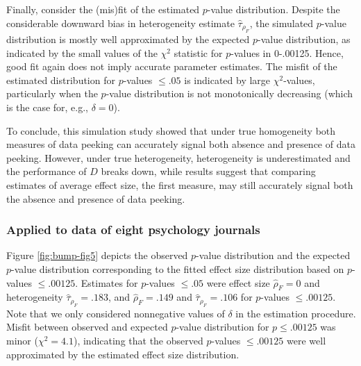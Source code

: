 \documentclass[a5paper]{book}
\begin{document}
Finally, consider the (mis)fit of the estimated \(p\)-value
distribution. Despite the considerable downward bias in heterogeneity
estimate \(\hat{\tau}_{\rho_F}\), the simulated \(p\)-value distribution
is mostly well approximated by the expected \(p\)-value distribution, as
indicated by the small values of the \(\chi^2\) statistic for
\(p\)-values in 0-.00125. Hence, good fit again does not imply accurate
parameter estimates. The misfit of the estimated distribution for
\(p\)-values \(\leq.05\) is indicated by large \(\chi^2\)-values,
particularly when the \(p\)-value distribution is not monotonically
decreasing (which is the case for, e.g., \(\delta=0\)).

To conclude, this simulation study showed that under true homogeneity
both measures of data peeking can accurately signal both absence and
presence of data peeking. However, under true heterogeneity,
heterogeneity is underestimated and the performance of \(D\) breaks
down, while results suggest that comparing estimates of average effect
size, the first measure, may still accurately signal both the absence
and presence of data peeking.

\subsubsection{Applied to data of eight psychology
journals}\label{applied-to-data-of-eight-psychology-journals}

Figure \ref{fig:bump-fig5} depicts the observed \(p\)-value distribution
and the expected \(p\)-value distribution corresponding to the fitted
effect size distribution based on \(p\)-values \(\leq.00125\). Estimates
for \(p\)-values \(\leq.05\) were effect size \(\hat{\rho}_F=0\) and
heterogeneity \(\hat{\tau}_{\rho_F}=.183\), and \(\hat{\rho}_F=.149\)
and \(\hat{\tau}_{\rho_F}=.106\) for \(p\)-values \(\leq.00125\). Note
that we only considered nonnegative values of \(\delta\) in the
estimation procedure. Misfit between observed and expected \(p\)-value
distribution for \(p\leq.00125\) was minor (\(\chi^2=4.1\)), indicating
that the observed \(p\)-values \(\leq.00125\) were well approximated by
the estimated effect size distribution.
\end{document}
